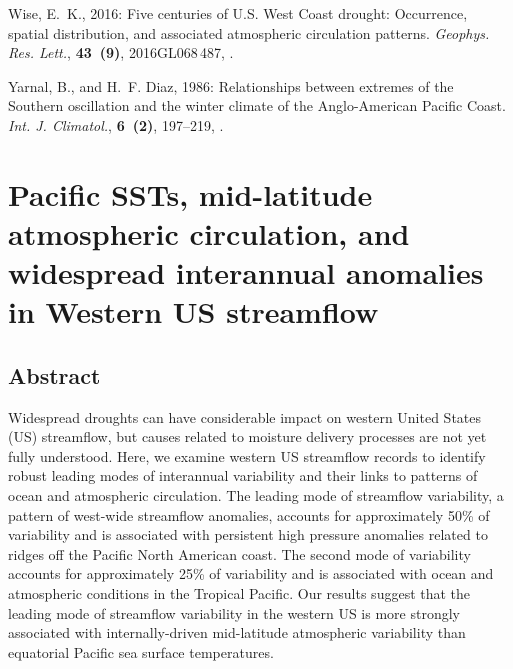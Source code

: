 \documentclass[final, double]{ua-thesis}
\begin{document}
\begin{thebibliography}{}
Wise, E.~K., 2016: Five centuries of {U}.{S}. {West} {Coast} drought:
  {Occurrence}, spatial distribution, and associated atmospheric circulation
  patterns. \textit{Geophys. Res. Lett.}, \textbf{43~(9)}, 2016GL068\,487,
  .

Yarnal, B., and H.~F. Diaz, 1986: Relationships between extremes of the
  {Southern} oscillation and the winter climate of the {Anglo}-{American}
  {Pacific} {Coast}. \textit{Int. J. Climatol.}, \textbf{6~(2)}, 197--219,
  .

\end{thebibliography}


% 






\appendix

\chapter{Pacific SSTs, mid-latitude atmospheric circulation, and widespread interannual anomalies in Western US streamflow}

\section{Abstract}
Widespread droughts can have considerable impact on western United States (US) streamflow, but causes related to moisture delivery processes are not yet fully understood. Here, we examine western US streamflow records to identify robust leading modes of interannual variability and their links to patterns of ocean and atmospheric circulation. The leading mode of streamflow variability, a pattern of west-wide streamflow anomalies, accounts for approximately 50\% of variability and is associated with persistent high pressure anomalies related to ridges off the Pacific North American coast. The second mode of variability accounts for approximately 25\% of variability and is associated with ocean and atmospheric conditions in the Tropical Pacific. Our results suggest that the leading mode of streamflow variability in the western US is more strongly associated with internally-driven mid-latitude atmospheric variability than equatorial Pacific sea surface temperatures.
\end{document}
